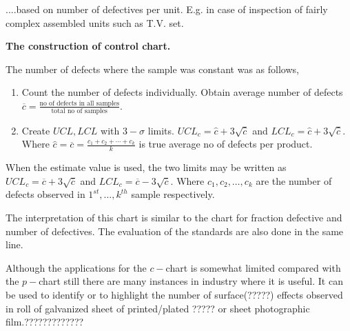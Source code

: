 \documentclass[oneside,11pt,pdftex]{book}%
\numberwithin{equation}{section}
\numberwithin{section}{chapter}
\numberwithin{equation}{chapter}
\begin{document}
....based on number of defectives per unit. E.g. in case of inspection of fairly complex assembled units such as T.V. set.

\textbf{The construction of control chart.}

The number of defects where the sample was constant was as follows,

\begin{enumerate}
	\item Count the number of defects individually. Obtain average number of defects $ \overline{c} = \frac{\text{no of defects in all samples}}{\text{total no of samples}}$.
	\item Create $ UCL, LCL $ with $ 3-\sigma  $ limits. $ UCL_c=\hat{c} + 3\sqrt{\hat{c}} $ and $ LCL_c= \hat{c}+3 \sqrt{\hat{c}}$. Where $ \hat{c} =\overline{c}=\frac{c_1+c_2+\cdots+c_k}{k}$ is true average no of defects per product.
\end{enumerate}

When the estimate value is used, the two limits may be written as $ UCL_c=\overline{c} + 3 \sqrt{\overline{c}}$ and $ LCL_c=\overline{c} - 3\sqrt{\overline{c}}$. Where $ c_1,c_2,\dots,c_k $ are the number of defects observed in $ 1^{st}, \dots, k^{th}$ sample respectively.


The interpretation of this chart is similar to the chart for fraction defective and number of defectives. The evaluation of the standards are also done in the same line.

Although the applications for the $ c- $chart is somewhat limited compared with the $ p- $chart still there are many instances in industry where it is useful. It can be used to identify or to highlight the number of surface(?????) effects observed in roll of galvanized sheet of printed/plated ????? or sheet photographic film.?????????????
\end{document}
